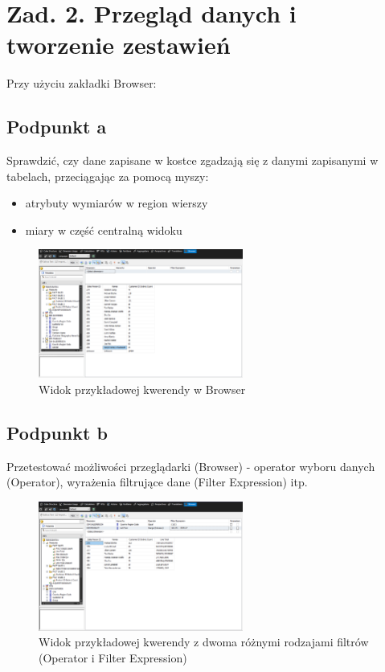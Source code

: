 \documentclass[a4paper,12pt]{article}
\begin{document}
\section{Zad. 2. Przegląd danych i tworzenie zestawień}

Przy użyciu zakładki Browser:

\subsection{Podpunkt a}

Sprawdzić, czy dane zapisane w kostce zgadzają się z danymi zapisanymi w tabelach, przeciągając za pomocą myszy:
\begin{itemize}
  \item atrybuty wymiarów w region wierszy
  \item miary w część centralną widoku
\end{itemize}

\begin{figure}[H]
  \centering
  \includegraphics[width=0.6\textwidth]{2a.png}
  \caption{Widok przykładowej kwerendy w Browser}
\end{figure}

\subsection{Podpunkt b}

Przetestować możliwości przeglądarki (Browser) - operator wyboru danych (Operator), wyrażenia filtrujące dane (Filter Expression) itp.

\begin{figure}[H]
  \centering
  \includegraphics[width=0.6\textwidth]{2b.png}
  \caption{Widok przykładowej kwerendy z dwoma różnymi rodzajami filtrów (Operator i Filter Expression)}
\end{figure}
\end{document}
